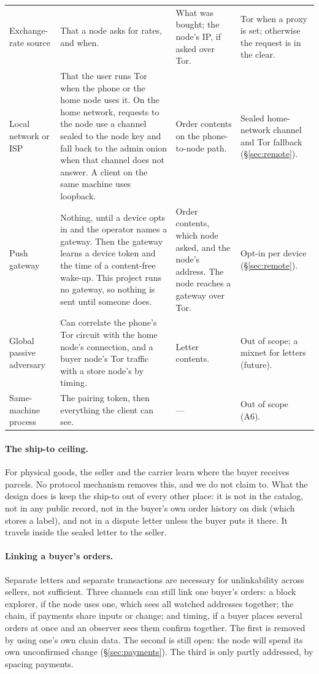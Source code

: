 {\begin{longtable}{@{}p{}p{}p{}p{}@{}}
Exchange-rate source & That a node asks for rates, and when. & What was bought; the node's IP, if asked over Tor. & Tor when a proxy is set; otherwise the request is in the clear. \\
Local network or ISP & That the user runs Tor when the phone or the home node uses it. On the home network, requests to the node use a channel sealed to the node key and fall back to the admin onion when that channel does not answer. A client on the same machine uses loopback. & Order contents on the phone-to-node path. & Sealed home-network channel and Tor fallback (\S\ref{sec:remote}). \\
Push gateway & Nothing, until a device opts in and the operator names a gateway. Then the gateway learns a device token and the time of a content-free wake-up. This project runs no gateway, so nothing is sent until someone does. & Order contents, which node asked, and the node's address. The node reaches a gateway over Tor. & Opt-in per device (\S\ref{sec:remote}). \\
Global passive adversary & Can correlate the phone's Tor circuit with the home node's connection, and a buyer node's Tor traffic with a store node's by timing. & Letter contents. & Out of scope; a mixnet for letters (future). \\
Same-machine process & The pairing token, then everything the client can see. & --- & Out of scope (A6). \\
\end{longtable}
}

\paragraph{The ship-to ceiling.} For physical goods, the seller and the carrier learn where the buyer receives parcels. No protocol mechanism removes this, and we do not claim to. What the design does is keep the ship-to out of every other place: it is not in the catalog, not in any public record, not in the buyer's own order history on disk (which stores a label), and not in a dispute letter unless the buyer puts it there. It travels inside the sealed letter to the seller.

\paragraph{Linking a buyer's orders.} Separate letters and separate transactions are necessary for unlinkability across sellers, not sufficient. Three channels can still link one buyer's orders: a block explorer, if the node uses one, which sees all watched addresses together; the chain, if payments share inputs or change; and timing, if a buyer places several orders at once and an observer sees them confirm together. The first is removed by using one's own chain data. The second is still open: the node will spend its own unconfirmed change (\S\ref{sec:payments}). The third is only partly addressed, by spacing payments.
